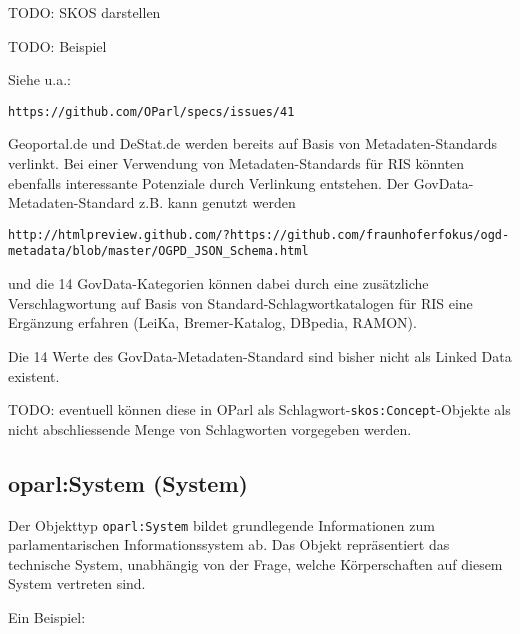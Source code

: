 \documentclass[,a4paper]{article}
\begin{document}
TODO: SKOS darstellen

TODO: Beispiel

Siehe u.a.:

\begin{verbatim}
https://github.com/OParl/specs/issues/41
\end{verbatim}

Geoportal.de und DeStat.de werden bereits auf Basis von
Metadaten-Standards verlinkt. Bei einer Verwendung von
Metadaten-Standards für RIS könnten ebenfalls interessante Potenziale
durch Verlinkung entstehen. Der GovData-Metadaten-Standard z.B. kann
genutzt werden

\begin{verbatim}
http://htmlpreview.github.com/?https://github.com/fraunhoferfokus/ogd-metadata/blob/master/OGPD_JSON_Schema.html
\end{verbatim}

und die 14 GovData-Kategorien können dabei durch eine zusätzliche
Verschlagwortung auf Basis von Standard-Schlagwortkatalogen für RIS eine
Ergänzung erfahren (LeiKa, Bremer-Katalog, DBpedia, RAMON).

Die 14 Werte des GovData-Metadaten-Standard sind bisher nicht als Linked
Data existent.

TODO: eventuell können diese in OParl als
Schlagwort-\texttt{skos:Concept}-Objekte als nicht abschliessende Menge
von Schlagworten vorgegeben werden.

\subsection{oparl:System (System)}\label{oparlux5fsystem}

Der Objekttyp \texttt{oparl:System} bildet grundlegende Informationen
zum parlamentarischen Informationssystem ab. Das Objekt repräsentiert
das technische System, unabhängig von der Frage, welche Körperschaften
auf diesem System vertreten sind.

Ein Beispiel:
\end{document}
